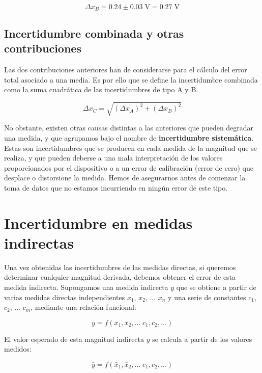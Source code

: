\documentclass{book}
\begin{document}
\begin{equation}
  \Delta x_B = 0.24 \pm 0.03 \; \textrm{V} = 0.27 \; \textrm{V}
\end{equation}

\subsection{Incertidumbre combinada y otras contribuciones}

Las dos contribuciones anteriores han de considerarse para el cálculo del error total asociado a
una media. Es por ello que se define la incertidumbre combinada como la suma cuadrática de las
incertidumbres de tipo A y B.

\begin{equation}
  \Delta x_C = \sqrt{(\Delta x_A)^2 + (\Delta x_B)^2}
\end{equation}

No obstante, existen otras causas distintas a las anteriores que pueden degradar una medida, y
que agrupamos bajo el nombre de \textbf{incertidumbre sistemática}. Estas son incertidumbres que se producen
en cada medida de la magnitud que se realiza, y que pueden deberse a una mala interpretación de
los valores proporcionados por el dispositivo o a un error de calibración (error de cero) que
desplace o distorsione la medida. Hemos de asegurarnos antes de comenzar la toma de datos que no
estamos incurriendo en ningún error de este tipo.

\section{Incertidumbre en medidas indirectas}

Una vez obtenidas las incertidumbres de las medidas directas, si queremos determinar cualquier
magnitud derivada, debemos obtener el error de esta medida indirecta. Supongamos una medida
indirecta $y$ que se obtiene a partir de varias medidas directas independientes $x_1$, $x_2$, 
... $x_n$  y una serie de constantes $c_1$, $c_2$, ... $c_m$, mediante una relación funcional:

\begin{equation}
  y = f(x_1, x_2, ... \; c_1, c_2, ...)
\end{equation}

El valor esperado de esta magnitud indirecta $y$ se calcula a partir de los valores medidos:

\begin{equation}
  \bar{y} = f(\bar{x}_1, \bar{x}_2, ... \; c_1, c_2, ...)
\end{equation}
\end{document}
